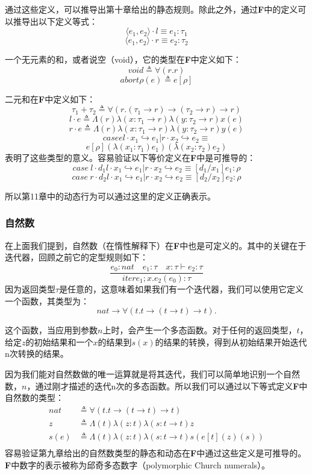 通过这些定义，可以推导出第十章给出的静态规则。除此之外，通过\textbf{F}中的定义可以推导出以下定义等式：
$$\langle e_1, e_2\rangle \cdot l \equiv e_1:\tau_1$$
$$\langle e_1, e_2\rangle \cdot r \equiv e_2:\tau_2$$

一个无元素的和，或者说空（void），它的类型在\textbf{F}中定义如下：
$$void \triangleq \forall (r.r)$$
$$abort{\rho}(e) \triangleq e[\rho]$$

二元和在\textbf{F}中定义如下：
$$\tau_1 + \tau_2 \triangleq \forall (r.(\tau_1 \to r) \to (\tau_2 \to r)\to r)$$
$$l \cdot e \triangleq \Lambda (r) \lambda (x:\tau_1 \to r) \lambda (y:\tau_2 \to r) x(e)$$
$$r \cdot e \triangleq \Lambda (r) \lambda (x:\tau_1 \to r) \lambda (y:\tau_2 \to r) y(e)$$
$$case e {l \cdot x_1 \hookrightarrow e_1 | r \cdot x_2 \hookrightarrow e_2} \equiv$$
$$e[\rho](\lambda (x_1:\tau_1)e_1)(\lambda(x_2:\tau_2)e_2)$$
表明了这些类型的意义。容易验证以下等价定义在\textbf{F}中是可推导的：
$$case \ l \cdot d_1{l \cdot x_1 \hookrightarrow e_1 | r \cdot x_2 \hookrightarrow e_2} \equiv [d_1/x_1]e_1:\rho$$
$$case \ r \cdot d_2{l \cdot x_1 \hookrightarrow e_1 | r \cdot x_2 \hookrightarrow e_2} \equiv [d_2/x_2]e_2:\rho$$

所以第11章中的动态行为可以通过这里的定义正确表示。

\subsubsection{自然数}
在上面我们提到，自然数（在惰性解释下）在\textbf{F}中也是可定义的。其中的关键在于迭代器，回顾之前它的定型规则如下：
$$\frac{e_0:nat \quad e_1:\tau \quad x:\tau \vdash e_2:\tau}{iter{e_1;x.e_2}(e_0):\tau}$$
因为返回类型$\tau$是任意的，这意味着如果我们有一个迭代器，我们可以使用它定义一个函数，其类型为：
$$nat \to \forall (t.t \to (t \to t) \to t).$$

这个函数，当应用到参数$n$上时，会产生一个多态函数。对于任何的返回类型，$t$，给定$z$的初始结果和一个$x$的结果到$s(x)$的结果的转换，得到从初始结果开始迭代n次转换的结果。

因为我们能对自然数做的唯一运算就是将其迭代，我们可以简单地识别一个自然数，$n$，通过刚才描述的迭代n次的多态函数。所以我们可以通过以下等式定义\textbf{F}中自然数的类型：
\begin{align*}
  nat &\triangleq \forall (t.t\to (t\to t) \to t) \\
  z   &\triangleq \Lambda(t) \lambda (z:t) \lambda (s:t \to t) z\\
  s(e)&\triangleq \Lambda(t) \lambda (z:t) \lambda (s:t \to t) s(e[t](z)(s))\\
\end{align*}
容易验证第九章给出的自然数类型的静态和动态在\textbf{F}中通过这些定义是可推导的。\textbf{F}中数字的表示被称为邱奇多态数字（polymorphic Church numerals）。

